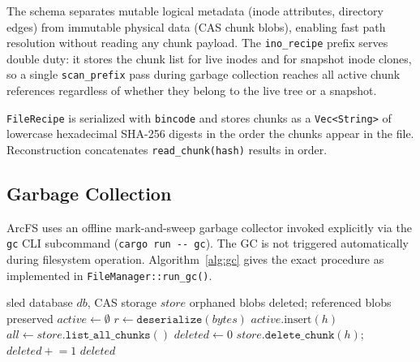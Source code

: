 \documentclass[5p,times]{elsarticle}
\begin{document}
The schema separates mutable logical metadata (inode attributes,
directory edges) from immutable physical data (CAS chunk blobs),
enabling fast path resolution without reading any chunk payload.
The \texttt{ino\_recipe} prefix serves double duty: it stores the
chunk list for live inodes and for snapshot inode clones, so a single
\texttt{scan\_prefix} pass during garbage collection reaches all active
chunk references regardless of whether they belong to the live tree or
a snapshot.

\texttt{FileRecipe} is serialized with \texttt{bincode} and stores chunks
as a \texttt{Vec\textless{}String\textgreater{}} of lowercase hexadecimal
SHA-256 digests in the order the chunks appear in the file.
Reconstruction concatenates \texttt{read\_chunk(hash)} results in order.

\subsection{Garbage Collection}
\label{sec:gc}

ArcFS uses an offline mark-and-sweep garbage collector invoked explicitly
via the \texttt{gc} CLI subcommand (\texttt{cargo run -{}- gc}).  The GC
is not triggered automatically during filesystem operation.  Algorithm~\ref{alg:gc}
gives the exact procedure as implemented in \texttt{FileManager::run\_gc()}.

\begin{algorithm}[t]
\caption{Offline Garbage Collection (\texttt{run\_gc()})}
\label{alg:gc}
\small
\begin{algorithmic}[1]
\REQUIRE sled database $\mathit{db}$, CAS storage $\mathit{store}$
\ENSURE orphaned blobs deleted; referenced blobs preserved
\STATE $\mathit{active} \leftarrow \emptyset$ \; 
  \STATE $r \leftarrow \texttt{deserialize}(\mathit{bytes})$
    \STATE $\mathit{active}.\text{insert}(h)$
  \ENDFOR
\ENDFOR
\STATE $\mathit{all} \leftarrow \mathit{store}.\texttt{list\_all\_chunks}()$
\STATE $\mathit{deleted} \leftarrow 0$
    \STATE $\mathit{store}.\texttt{delete\_chunk}(h)$;\;
           $\mathit{deleted} \mathrel{+}= 1$
  \ENDIF
\ENDFOR
\RETURN $\mathit{deleted}$
\end{algorithmic}
\end{algorithm}
\end{document}
